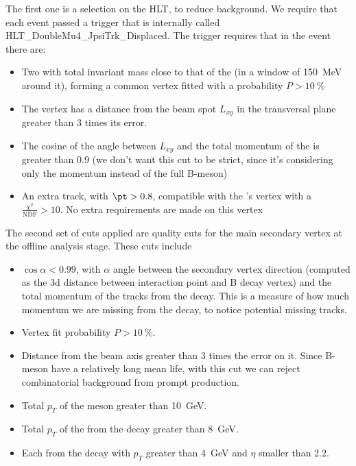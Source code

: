 The first one is a selection on the HLT, to reduce background. 
We require that each event passed a trigger that is internally called HLT\_DoubleMu4\_JpsiTrk\_Displaced.
The trigger requires that in the event there are:
\begin{itemize}
	\item Two \Pgm with total invariant mass close to that of the \PJgy (in a window of \SI{150}{\MeV} around it), forming a common vertex fitted with a probability $P>\SI{10}{\percent}$
	\item The vertex has a distance from the beam spot $L_{xy}$ in the transversal plane greater than 3 times its error.
	\item The cosine of the angle between $L_{xy}$ and the total momentum of the \Pgm is greater than 0.9 (we don't want this cut to be strict, since it's considering only the \PJgy momentum instead of the full B-meson)
	\item An extra track, with $\pt > 0.8$, compatible with the \Pgm's vertex with a $\frac{\chi^2}{\text{NDF}} > 10$. No extra requirements are made on this vertex
\end{itemize}

The second set of cuts applied are quality cuts for the main secondary vertex at the offline analysis stage.
These cuts include
\begin{itemize}
	\item $\cos{\alpha}< 0.99$, with $\alpha$ angle between the secondary vertex direction (computed as the 3d distance between \Pp\Pp interaction point and B decay vertex) and the total momentum of the tracks from the decay. This is a measure of how much momentum we are missing from the decay, to notice potential missing tracks.
	\item Vertex fit probability $ P > \SI{10}{\percent}$.
	\item Distance from the beam axis greater than 3 times the error on it. Since B-meson have a relatively long mean life, with this cut we can reject combinatorial background from prompt \PJgy production.
	\item Total $p_T$ of the meson greater than \SI{10}{\GeV}.
	\item Total $p_T$ of the \PJgy from the decay greater than \SI{8}{\GeV}.
	\item Each \Pgm from the \PJgy decay with $p_T$ greater than \SI{4}{\GeV} and $\eta$ smaller than \num{2.2}.
\end{itemize}

